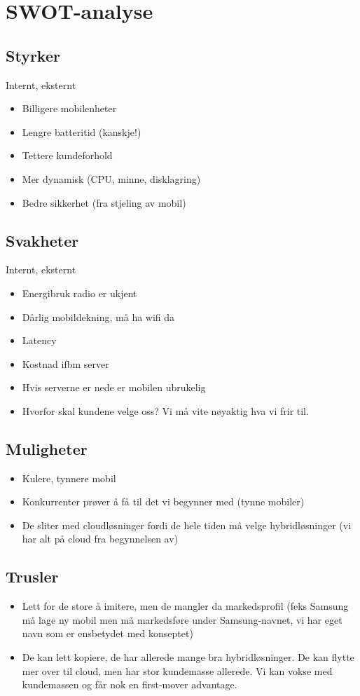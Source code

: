 \section{SWOT-analyse}

\subsection{Styrker}
Internt, eksternt
\begin{itemize}
  \item Billigere mobilenheter
  \item Lengre batteritid (kanskje!)
  \item Tettere kundeforhold
  \item Mer dynamisk (CPU, minne, disklagring)
  \item Bedre sikkerhet (fra stjeling av mobil)
\end{itemize}

\subsection{Svakheter}
Internt, eksternt
\begin{itemize}
  \item Energibruk radio er ukjent
  \item Dårlig mobildekning, må ha wifi da
  \item Latency
  \item Kostnad ifbm server
  \item Hvis serverne er nede er mobilen ubrukelig
  \item Hvorfor skal kundene velge oss? Vi må vite nøyaktig hva vi frir til.
\end{itemize}

\subsection{Muligheter}
\begin{itemize}
  \item Kulere, tynnere mobil
  \item Konkurrenter prøver å få til det vi begynner med (tynne mobiler)
  \item De sliter med cloudløsninger fordi de hele tiden må velge
  hybridløsninger (vi har alt på cloud fra begynnelsen av)
\end{itemize}

\subsection{Trusler}
\begin{itemize}
  \item Lett for de store å imitere, men de mangler da markedsprofil (feks
      Samsung må lage ny mobil men må markedsføre under Samsung-navnet, vi har
      eget navn som er ensbetydet med konseptet)
  \item De kan lett kopiere, de har allerede mange bra hybridløsninger. De kan
  flytte mer over til cloud, men har stor kundemasse allerede. Vi kan vokse med
  kundemassen og får nok en first-mover advantage.
\end{itemize}

